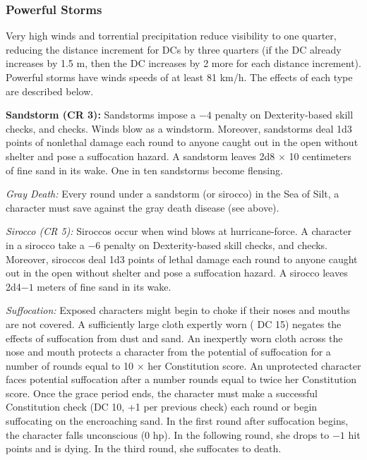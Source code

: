 \subsubsection{Powerful Storms}
Very high winds and torrential precipitation reduce visibility to one quarter, reducing the distance increment for  DCs by three quarters (if the DC already increases by 1.5 m, then the DC increases by 2 more for each distance increment). Powerful storms have winds speeds of at least 81 km/h. The effects of each type are described below.


\textbf{Sandstorm (CR 3):} Sandstorms impose a $-4$ penalty on Dexterity-based skill checks, and  checks. Winds blow as a windstorm. Moreover, sandstorms deal 1d3 points of nonlethal damage each round to anyone caught out in the open without shelter and pose a suffocation hazard. A sandstorm leaves 2d8 $\times$ 10 centimeters of fine sand in its wake. One in ten sandstorms become flensing.

\textit{Gray Death:} Every round under a sandstorm (or sirocco) in the Sea of Silt, a character must save against the gray death disease (see above).

\textit{Sirocco (CR 5):} Siroccos occur when wind blows at hurricane-force. A character in a sirocco take a $-6$ penalty on Dexterity-based skill checks, and  checks. Moreover, siroccos deal 1d3 points of lethal damage each round to anyone caught out in the open without shelter and pose a suffocation hazard. A sirocco leaves 2d4$-1$ meters of fine sand in its wake.

\textit{Suffocation:} Exposed characters might begin to choke if their noses and mouths are not covered. A sufficiently large cloth expertly worn ( DC 15) negates the effects of suffocation from dust and sand. An inexpertly worn cloth across the nose and mouth protects a character from the potential of suffocation for a number of rounds equal to 10 $\times$ her Constitution score. An unprotected character faces potential suffocation after a number rounds equal to twice her Constitution score. Once the grace period ends, the character must make a successful Constitution check (DC 10, +1 per previous check) each round or begin suffocating on the encroaching sand. In the first round after suffocation begins, the character falls unconscious (0 hp). In the following round, she drops to $-1$ hit points and is dying. In the third round, she suffocates to death.

